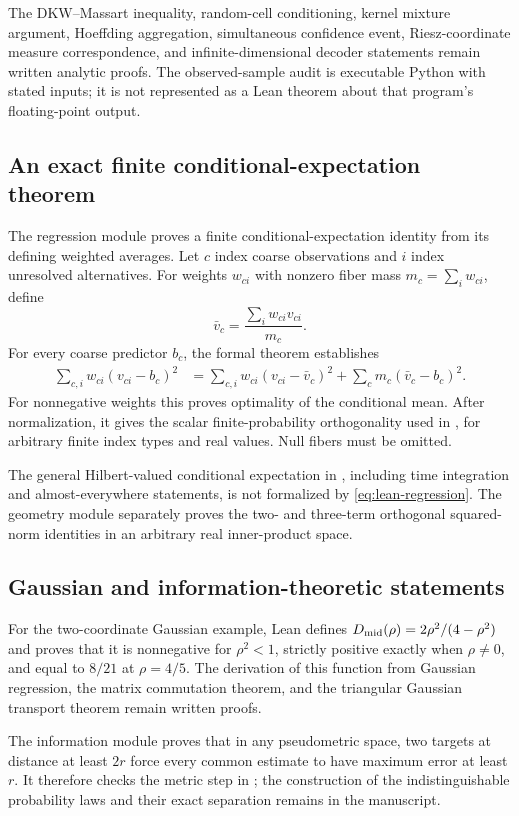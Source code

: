 The DKW--Massart inequality, random-cell conditioning, kernel mixture argument, Hoeffding aggregation, simultaneous confidence event, Riesz-coordinate measure correspondence, and infinite-dimensional decoder statements remain written analytic proofs. The observed-sample audit is executable Python with stated inputs; it is not represented as a Lean theorem about that program's floating-point output.

\subsection{An exact finite conditional-expectation theorem}
The regression module proves a finite conditional-expectation identity from its defining weighted averages. Let $c$ index coarse observations and $i$ index unresolved alternatives. For weights $w_{ci}$ with nonzero fiber mass
$m_c=\sum_iw_{ci}$, define
\[
 \bar v_c=\frac{\sum_iw_{ci}v_{ci}}{m_c}.
\]
For every coarse predictor $b_c$, the formal theorem establishes
\begin{align}\label{eq:lean-regression}
 \sum_{c,i}w_{ci}(v_{ci}-b_c)^2
 &=\sum_{c,i}w_{ci}(v_{ci}-\bar v_c)^2
 +\sum_cm_c(\bar v_c-b_c)^2.
\end{align}
For nonnegative weights this proves optimality of the conditional mean. After normalization, it gives the scalar finite-probability orthogonality used in , for arbitrary finite index types and real values. Null fibers must be omitted.

The general Hilbert-valued conditional expectation in , including time integration and almost-everywhere statements, is not formalized by \eqref{eq:lean-regression}. The geometry module separately proves the two- and three-term orthogonal squared-norm identities in an arbitrary real inner-product space.

\subsection{Gaussian and information-theoretic statements}
For the two-coordinate Gaussian example, Lean defines
$D_{\rm mid}(\rho)=2\rho^2/(4-\rho^2)$ and proves that it is nonnegative for $\rho^2<1$, strictly positive exactly when $\rho\ne0$, and equal to $8/21$ at $\rho=4/5$. The derivation of this function from Gaussian regression, the matrix commutation theorem, and the triangular Gaussian transport theorem remain written proofs.

The information module proves that in any pseudometric space, two targets at distance at least $2r$ force every common estimate to have maximum error at least $r$. It therefore checks the metric step in ; the construction of the indistinguishable probability laws and their exact separation remains in the manuscript.

